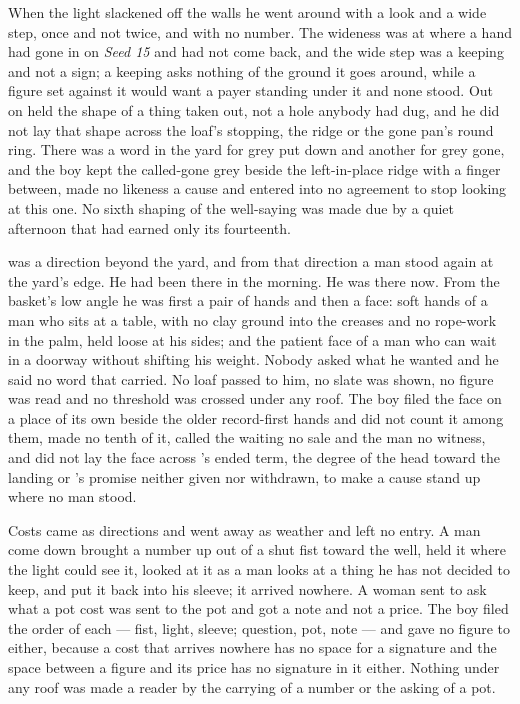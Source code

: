 When the light slackened off the walls he went around  with a look and a wide step, once and not twice, and with no number. The wideness was at  where a hand had gone in on \emph{Seed 15} and had not come back, and the wide step was a keeping and not a sign; a keeping asks nothing of the ground it goes around, while a figure set against it would want a payer standing under it and none stood. Out on   held the shape of a thing taken out, not a hole anybody had dug, and he did not lay that shape across the loaf's stopping, the ridge or the gone pan's round ring. There was a word in the yard for grey put down and another for grey gone, and the boy kept the called-gone grey beside the left-in-place ridge with a finger between, made no likeness a cause and entered into no agreement to stop looking at this one. No sixth shaping of the well-saying was made due by a quiet afternoon that had earned only its fourteenth.

 was a direction beyond the yard, and from that direction a man stood again at the yard's edge. He had been there in the morning. He was there now. From the basket's low angle he was first a pair of hands and then a face: soft hands of a man who sits at a table, with no clay ground into the creases and no rope-work in the palm, held loose at his sides; and the patient face of a man who can wait in a doorway without shifting his weight. Nobody asked what he wanted and he said no word that carried. No loaf passed to him, no slate was shown, no figure was read and no threshold was crossed under any roof. The boy filed the face on a place of its own beside the older record-first hands and did not count it among them, made no tenth of it, called the waiting no sale and the man no witness, and did not lay the face across \person[Tarn]'s ended term, the degree of the head toward the landing or 's promise neither given nor withdrawn, to make a cause stand up where no man stood.

Costs came as directions and went away as weather and left no entry. A man come down  brought a number up out of a shut fist toward the well, held it where the light could see it, looked at it as a man looks at a thing he has not decided to keep, and put it back into his sleeve; it arrived nowhere. A woman sent to ask what a pot cost was sent to the pot and got a note and not a price. The boy filed the order of each --- fist, light, sleeve; question, pot, note --- and gave no figure to either, because a cost that arrives nowhere has no space for a signature and the space between a figure and its price has no signature in it either. Nothing under any roof was made a reader by the carrying of a number or the asking of a pot.

